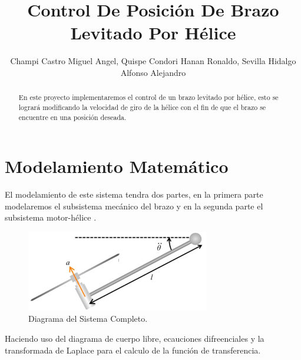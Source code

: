 \documentclass[a4paper]{IEEEtran} %
\begin{document}
\title{Control De Posición De Brazo Levitado Por Hélice}
\author{Champi Castro Miguel Angel, Quispe Condori Hanan Ronaldo, Sevilla Hidalgo Alfonso Alejandro}
\maketitle
\begin{abstract}
En este proyecto implementaremos el control de un brazo levitado por hélice, esto se logrará modificando la velocidad de giro de la hélice con el fin de que el brazo se encuentre en una posición deseada.
\end{abstract}
\section{Modelamiento Matemático}
\label{sec:modelamiento}
El modelamiento de este sistema tendra dos partes, en la primera parte modelaremos el subsistema mecánico del brazo y en la segunda parte el subsistema motor-hélice \cite{gunel2016modeling}.
\begin{figure}[h]
    \centering
        \includegraphics[width=8cm]{images/1}
        \caption{Diagrama del Sistema Completo.}
        \label{fig:DLC}
\end{figure}

Haciendo uso del diagrama de cuerpo libre, ecauciones difreenciales y la transformada de Laplace para el calculo de la función de transferencia. 
\end{document}
